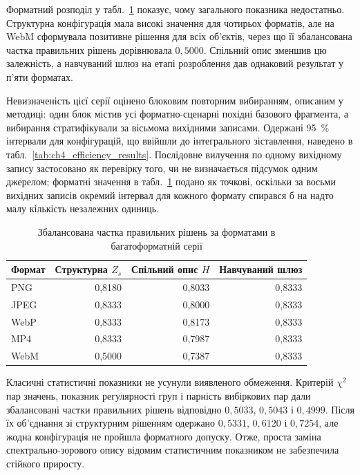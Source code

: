 Форматний розподіл у табл.~\ref{tab:ch4_format_transfer} показує, чому загального показника недостатньо. Структурна конфігурація мала високі значення для чотирьох форматів, але на WebM сформувала позитивне рішення для всіх об’єктів, через що її збалансована частка правильних рішень дорівнювала $0{,}5000$. Спільний опис зменшив цю залежність, а навчуваний шлюз на етапі розроблення дав однаковий результат у п’яти форматах.

Невизначеність цієї серії оцінено блоковим повторним вибиранням, описаним у методиці: один блок містив усі форматно-сценарні похідні базового фрагмента, а вибирання стратифікували за вісьмома вихідними записами. Одержані 95~\% інтервали для конфігурацій, що ввійшли до інтегрального зіставлення, наведено в табл.~\ref{tab:ch4_efficiency_results}. Послідовне вилучення по одному вихідному запису застосовано як перевірку того, чи не визначається підсумок одним джерелом; форматні значення в табл.~\ref{tab:ch4_format_transfer} подано як точкові, оскільки за восьми вихідних записів окремий інтервал для кожного формату спирався б на надто малу кількість незалежних одиниць.

\begin{table}[htbp]
\caption{Збалансована частка правильних рішень за форматами в багатоформатній серії}
\label{tab:ch4_format_transfer}
\centering
\small
\begin{tabular}{lrrr}
\toprule
Формат & Структурна $Z_s$ & Спільний опис $H$ & Навчуваний шлюз \\
\midrule
PNG & 0,8180 & 0,8033 & 0,8333 \\
JPEG & 0,8333 & 0,8000 & 0,8333 \\
WebP & 0,8333 & 0,8173 & 0,8333 \\
MP4 & 0,8333 & 0,7987 & 0,8333 \\
WebM & 0,5000 & 0,7387 & 0,8333 \\
\bottomrule
\end{tabular}
\end{table}

Класичні статистичні показники не усунули виявленого обмеження. Критерій $\chi^2$ пар значень, показник регулярності груп і парність вибіркових пар дали збалансовані частки правильних рішень відповідно $0{,}5033$, $0{,}5043$ і $0{,}4999$. Після їх об’єднання зі структурним рішенням одержано $0{,}5331$, $0{,}6120$ і $0{,}7254$, але жодна конфігурація не пройшла форматного допуску. Отже, проста заміна спектрально-зорового опису відомим статистичним показником не забезпечила стійкого приросту.

